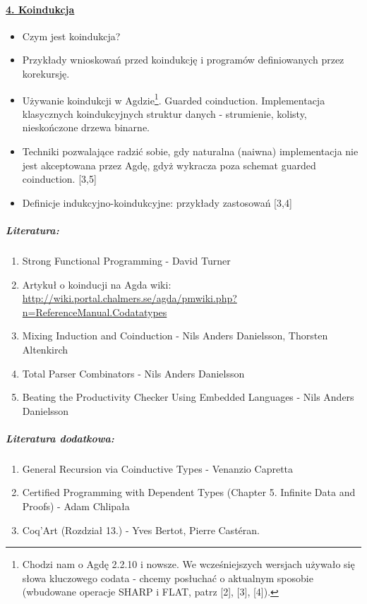 \documentclass[10pt, a4paper]{article}
\begin{document}
\paragraph{\underline{4. Koindukcja}} 

\begin{itemize}
\addtolength{\itemsep}{-0.5\baselineskip}

 \item Czym jest koindukcja?
 \item Przykłady wnioskowań przed koindukcję i programów definiowanych przez korekursję.
 \item Używanie koindukcji w Agdzie\footnote{
Chodzi nam o Agdę 2.2.10 i nowsze. We wcześniejszych wersjach używało się słowa kluczowego codata - chcemy posłuchać o aktualnym sposobie (wbudowane operacje SHARP i FLAT, patrz [2], [3], [4]).
}. Guarded coinduction. Implementacja klasycznych koindukcyjnych struktur danych - strumienie, kolisty, nieskończone drzewa binarne.
 \item Techniki pozwalające radzić sobie, gdy naturalna (naiwna) implementacja nie jest akceptowana przez Agdę, gdyż wykracza poza schemat guarded coinduction. [3,5]
 \item Definicje indukcyjno-koindukcyjne: przykłady zastosowań [3,4]
\end{itemize}

\subparagraph{Literatura:}

\begin{enumerate}
\addtolength{\itemsep}{-0.5\baselineskip}
 \item Strong Functional Programming - David Turner
 \item Artykuł o koinducji na Agda wiki: \\ {\small
       \url{http://wiki.portal.chalmers.se/agda/pmwiki.php?n=ReferenceManual.Codatatypes}
      }
 \item Mixing Induction and Coinduction - Nils Anders Danielsson, Thorsten Altenkirch
 \item Total Parser Combinators - Nils Anders Danielsson
 \item Beating the Productivity Checker Using Embedded Languages - Nils Anders Danielsson
\end{enumerate}

\subparagraph{Literatura dodatkowa:}

\begin{enumerate}
\addtolength{\itemsep}{-0.5\baselineskip}
 \item General Recursion via Coinductive Types - Venanzio Capretta
 \item Certified Programming with Dependent Types (Chapter 5. Infinite Data and Proofs) - Adam Chlipała
 \item Coq’Art (Rozdział 13.) - Yves Bertot, Pierre Castéran.
\end{enumerate}
\end{document}
